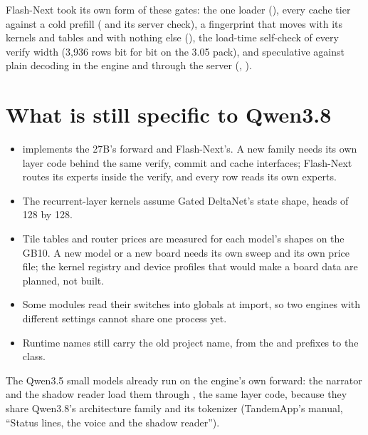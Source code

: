 Flash-Next took its own form of these gates: the one loader (), every cache tier against a cold prefill ( and its server check), a fingerprint that moves with its kernels and tables and with nothing else (), the load-time self-check of every verify width (3,936 rows bit for bit on the 3.05 pack), and speculative against plain decoding in the engine and through the server (, ).

\section{What is still specific to Qwen3.8}

\begin{itemize}
\item {} implements the 27B's forward and  Flash-Next's. A new family needs its own layer code behind the same verify, commit and cache interfaces; Flash-Next routes its experts inside the verify, and every row reads its own experts.
\item The recurrent-layer kernels assume Gated DeltaNet's state shape, heads of 128 by 128.
\item Tile tables and router prices are measured for each model's shapes on the GB10. A new model or a new board needs its own sweep and its own price file; the kernel registry and device profiles that would make a board data are planned, not built.
\item Some modules read their switches into globals at import, so two engines with different settings cannot share one process yet.
\item Runtime names still carry the old project name, from the  and  prefixes to the  class.
\end{itemize}

The Qwen3.5 small models already run on the engine's own forward: the narrator and the shadow reader load them through , the same layer code, because they share Qwen3.8's architecture family and its tokenizer (TandemApp's manual, \enquote{Status lines, the voice and the shadow reader}).
